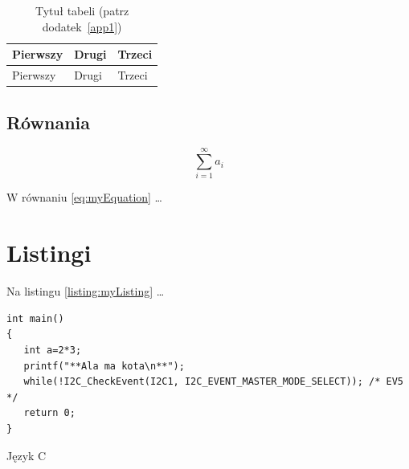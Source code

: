 \begin{table}
\centering\caption{Tytuł tabeli (patrz dodatek~\ref{app1}) \label{table:table1}}
\begin{tabular}{|l|l|l|}%
\hline
Pierwszy & Drugi & Trzeci \\
\hline
Pierwszy & Drugi & Trzeci \\
\hline
\end{tabular}
\end{table}

\subsection{Równania}

\begin{equation}
\sum_{i=1}^{\infty}a_i
\label{eq:myEquation}
\end{equation}

W równaniu \ref{eq:myEquation} \dots

\section{Listingi}

Na listingu \ref{listing:myListing} \dots

\begin{listing}
\begin{verbatim}  
int main()
{
   int a=2*3;
   printf("**Ala ma kota\n**");
   while(!I2C_CheckEvent(I2C1, I2C_EVENT_MASTER_MODE_SELECT)); /* EV5 */
   return 0;
}
\end{verbatim}
\caption{Język C} \label{listing:myListing}
\end{listing}

